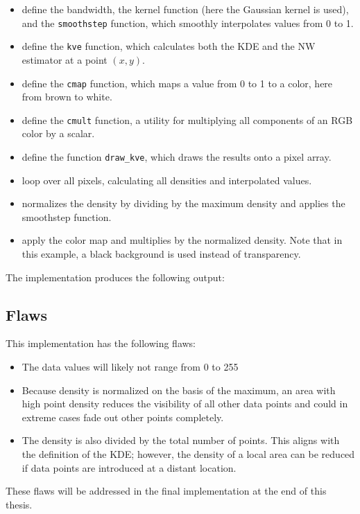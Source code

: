 \begin{itemize}
    \item {} define the bandwidth, the kernel function (here the Gaussian kernel is used), and the \verb|smoothstep| function\cite{quilez:smoothstep}, which smoothly interpolates values from 0 to 1.
    \item {} define the \verb|kve| function, which calculates both the KDE and the NW estimator at a point $(x, y)$.
    \item {} define the \verb|cmap| function, which maps a value from 0 to 1 to a color, here from brown to white.
    \item {} define the \verb|cmult| function, a utility for multiplying all components of an RGB color by a scalar.
    \item {} define the function \verb|draw_kve|, which draws the results onto a pixel array.
    \item {} loop over all pixels, calculating all densities and interpolated values.
    \item {} normalizes the density by dividing by the maximum density and applies the smoothstep function.
    \item {} apply the color map and multiplies by the normalized density. Note that in this example, a black background is used instead of transparency.
\end{itemize}

The implementation produces the following output:


\subsection{Flaws}\label{subsec:flaws}
This implementation has the following flaws:
\begin{itemize}
    \item The data values will likely not range from 0 to 255
    \item Because density is normalized on the basis of the maximum, an area with high point density reduces the visibility of all other data points and could in extreme cases fade out other points completely.
    \item The density is also divided by the total number of points. This aligns with the definition of the KDE\@; however, the density of a local area can be reduced if data points are introduced at a distant location.
\end{itemize}

These flaws will be addressed in the final implementation at the end of this thesis.
